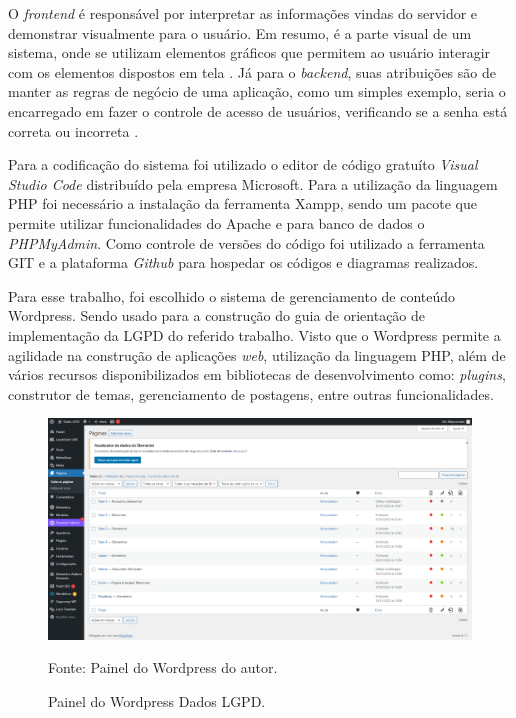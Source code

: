 \documentclass[
	12pt,				%
	openright,			%
	oneside,			%
	a4paper,			%
	english,			%
	french,				%
	spanish,			%
	brazil,				%
	]{abntex2}
\begin{document}
O \textit{frontend} é responsável por interpretar as informações vindas do servidor e demonstrar visualmente para o usuário. Em resumo, é a parte visual de um sistema, onde se utilizam elementos gráficos que permitem ao usuário interagir com os elementos dispostos em tela \cite{Alura}. Já para o \textit{backend}, suas atribuições são de manter as regras de negócio de uma aplicação, como um simples exemplo, seria o encarregado em fazer o controle de acesso de usuários, verificando se a senha está correta ou incorreta \cite{Rocketseat}.

Para a codificação do sistema foi utilizado o editor de código gratuíto \textit{Visual Studio Code} distribuído pela empresa Microsoft. Para a utilização da linguagem PHP foi necessário a instalação da ferramenta Xampp, sendo um pacote que permite utilizar funcionalidades do Apache e para banco de dados o \textit{PHPMyAdmin}. Como controle de versões do código foi utilizado a ferramenta GIT e a plataforma \textit{Github} para hospedar os códigos e diagramas realizados. 

Para esse trabalho, foi escolhido o sistema de gerenciamento de conteúdo  Wordpress. Sendo usado para a construção do guia de orientação de implementação da LGPD do referido trabalho. Visto que o Wordpress permite a agilidade na construção de aplicações \textit{web}, utilização da linguagem PHP, além de vários recursos disponibilizados em bibliotecas de desenvolvimento como: \textit{plugins}, construtor de temas, gerenciamento de postagens, entre outras funcionalidades.

\begin{figure}[ht]
    \centering
    \caption{Painel do Wordpress Dados LGPD.}
    \includegraphics[width=6.0in]{Images/wordpress.png}
    \label{fig: grafico-acc}
    
    \centering \small Fonte: Painel do Wordpress do autor.
\end{figure}
\end{document}

